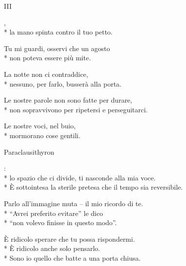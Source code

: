 \documentclass[12pt]{book}
\begin{document}
\begin{poem}{III}{}

\settowidth{\versewidth}{non meno è ciò che meriti.}
\begin{changemargin}{-1cm}{-2cm} 
\begin{altverse}
\quad \qquad {},\\*
la mano spinta contro il tuo petto.
\end{altverse}


\begin{altverse}
Tu mi guardi, osservi che un agosto\\*
non poteva essere più mite.
\end{altverse}


\begin{altverse}
La notte non ci contraddice,\\*
nessuno, per farlo, busserà alla porta.
\end{altverse}


\begin{altverse}
Le nostre parole non sono fatte per durare,\\*
non sopravvivono per ripetersi e perseguitarci.
\end{altverse}


\begin{altverse}
Le nostre voci, nel buio,\\*
mormorano cose gentili.
\end{altverse}
\end{changemargin}
\end{poem}

\begin{poem}{Paraclausithyron}{}

\settowidth{\versewidth}{non meno è ciò che meriti.}
\begin{changemargin}{-2cm}{-3cm} 
\begin{altverse}
: \\*
lo spazio che ci divide, ti nasconde alla mia voce. \\*
È sottointesa la sterile pretesa che il tempo sia reversibile.
\end{altverse}

\begin{altverse}
Parlo all’immagine muta – il mio ricordo di te. \\*
“Avrei preferito evitare” le dico \\*
“non volevo finisse in questo modo”.
\end{altverse}

\begin{altverse}
È ridicolo sperare che tu possa rispondermi. \\*
È ridicolo anche solo pensarlo. \\*
Sono io quello che batte a una porta chiusa.
\end{altverse}

\end{changemargin}
\end{poem}
\end{document}
